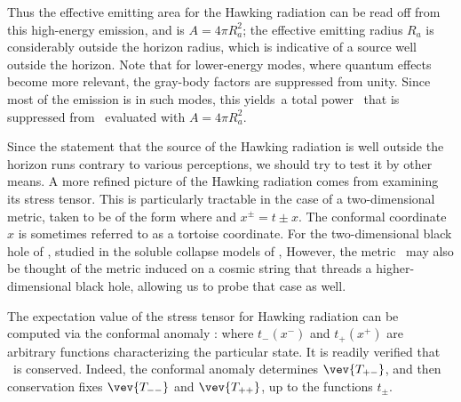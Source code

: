 Thus  the effective emitting area for the Hawking radiation can be read off from this high-energy emission, and is $A=4\pi R_a^2$; the effective emitting radius $R_a$ is considerably outside the horizon radius, which is indicative of a source well outside the horizon.
Note that for lower-energy modes, where quantum effects become more relevant, the gray-body factors are suppressed from unity.  Since most of the emission is in such modes, this yields\Page\ a total power \pagerate\ that is suppressed from \SB\ evaluated with $A=4\pi R_a^2$.

Since the statement that the source of the Hawking radiation is well outside the horizon runs contrary to various perceptions, we should try to test it by other means.  A more refined picture of the Hawking radiation comes from examining its stress tensor.  This is particularly tractable in the case of a two-dimensional metric, taken to be of the form
%
\eqn{}
%
where 
%
\eqn{}
%
and $x^\pm=t\pm x$.  
The conformal coordinate $x$ is sometimes referred to as a tortoise coordinate.  For the two-dimensional black hole of \Witt, studied in the soluble collapse models of , 
%
\eqn{}
%
However, the metric \tdmet\ may also be thought of the metric induced on a cosmic string that threads a higher-dimensional black hole, allowing us to probe that case as well.

The expectation value of the stress tensor for Hawking radiation can be computed via the conformal anomaly :
%
\eqn{}
where $t_-(x^-)$ and $t_+(x^+)$ are arbitrary functions characterizing the particular state.  It is readily verified that \stress\ is conserved.  Indeed, the conformal anomaly determines $\vev{T_{+-}}$, and then conservation fixes $\vev {T_{--}}$ and $\vev{T_{++}}$, up to the functions $t_\pm$.


